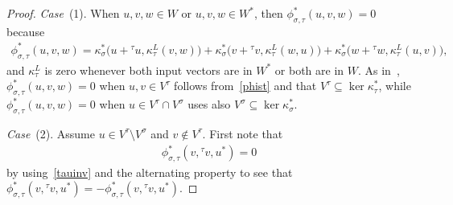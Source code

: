 \documentclass[10pt,a4paper]{amsart}
\numberwithin{equation}{section}
\newcommand{\actbylessspace}[1]{{}^{#1}\!}
\newcommand{\kappaLxy}[5]{\kappa^{*}_{#1}\big(#3+{}^{#2}#3,\kappa^L_{#2}(#4,#5)\big)}
\newcommand{\phibulletxy}[5]{\kappaLxy{#1}{#2}{#3}{#4}{#5}+\kappaLxy{#1}{#2}{#4}{#5}{#3}+\kappaLxy{#1}{#2}{#5}{#3}{#4}}
\begin{document}
\begin{proof} \quad

\textit{Case}~(1). When $u,v,w \in W$ or $u,v,w \in W^*$, then $\phi^{*}_{\sigma,\tau}(u,v,w)=0$ because
	\begin{gather}
	\label{phist}
	\phi^{*}_{\sigma,\tau}(u,v,w)=\phibulletxy{\sigma}{\tau}{u}{v}{w},
	\end{gather}
and $\kappa^L_{\tau}$ is zero whenever both
input vectors are in $W^*$ or both are in $W$. As in~\cite{FGK},
$\phi^{*}_{\sigma,\tau}(u,v,w)=0$ when $u, v \in V^{\tau}$ follows from~\eqref{phist}
and that $V^{\tau}\subseteq \ker\kappa^*_{\tau}$, while $\phi^{*}_{\sigma,\tau}(u,v,w)=0$
when $u \in V^{\tau} \cap V^{\sigma}$ uses also $V^{\sigma}\subseteq \ker\kappa^*_{\sigma}$.

\textit{Case}~(2). Assume $u \in V^{\tau} \setminus V^{\sigma}$ and $v \notin V^\tau$.
First note that
	\begin{gather*}
	\phi^*_{\sigma,\tau}(v,\actbylessspace{\tau}v,u^*)=0
	\end{gather*}
by using~\eqref{tauinv}
and the alternating property to see that $\phi^*_{\sigma,\tau}(v,\actbylessspace{\tau}v,u^*)=-\phi^*_{\sigma,\tau}(v,\actbylessspace{\tau}v,u^*)$.
		

\end{proof}
\end{document}
